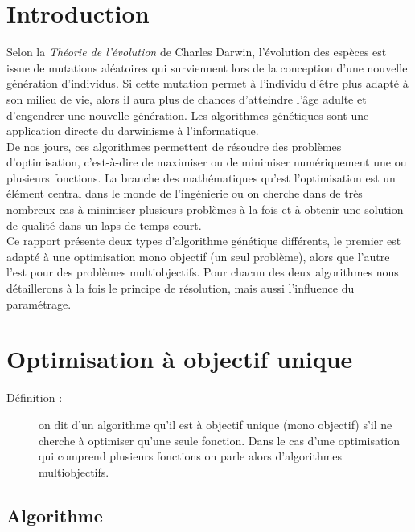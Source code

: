 \documentclass[12pt]{report}
\begin{document}
  \chapter{Introduction}
    Selon la \emph{Théorie de l'évolution} \cite{darwin} de Charles Darwin, l'évolution des espèces est issue de mutations aléatoires qui surviennent lors de la conception d'une nouvelle génération d'individus. Si cette mutation permet à l'individu d'être plus adapté à son milieu de vie, alors il aura plus de chances d'atteindre l'âge adulte et d'engendrer une nouvelle génération.
    Les algorithmes génétiques sont une application directe du darwinisme à l'informatique.\\
    De nos jours, ces algorithmes permettent de résoudre des problèmes d'optimisation, c'est-à-dire de maximiser ou de minimiser numériquement une ou plusieurs fonctions.
    La branche des mathématiques qu'est l'optimisation est un élément central dans le monde de l'ingénierie ou on cherche dans de très nombreux cas à minimiser plusieurs problèmes à la fois et à obtenir une solution de qualité dans un laps de temps court.\\
    Ce rapport présente deux types d'algorithme génétique différents, le premier est adapté à une optimisation mono objectif (un seul problème), alors que l'autre l'est pour des problèmes multiobjectifs. Pour chacun des deux algorithmes nous détaillerons à la fois le principe de résolution, mais aussi l'influence du paramétrage.

  \tableofcontents
  \chapter{Optimisation à objectif unique}
    \begin{description}
      \item[Définition :] on dit d'un algorithme qu'il est à objectif unique (mono objectif) s'il ne cherche à optimiser qu'une seule fonction. Dans le cas d'une optimisation qui comprend plusieurs fonctions on parle alors d'algorithmes multiobjectifs.
    \end{description}
    \section{Algorithme}
\end{document}
